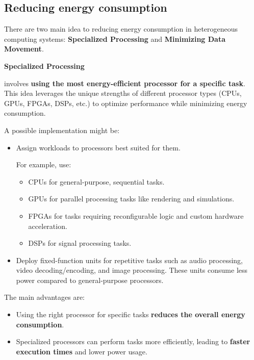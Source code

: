 \subsection{Reducing energy consumption}

There are two main idea to reducing energy consumption in heterogeneous computing systems: \textbf{Specialized Processing} and \textbf{Minimizing Data Movement}.

\highspace
\begin{flushleft}
    \textcolor{Green3}{ \textbf{Specialized Processing}}
\end{flushleft}
 involves \textbf{using the most energy-efficient processor for a specific task}. This idea leverages the unique strengths of different processor types (CPUs, GPUs, FPGAs, DSPs, etc.) to optimize performance while minimizing energy consumption.

\highspace
A possible implementation might be:
\begin{itemize}
    \item Assign workloads to processors best suited for them.
    \begin{examplebox}
        For example, use:
        \begin{itemize}
            \item CPUs for general-purpose, sequential tasks.
            \item GPUs for parallel processing tasks like rendering and simulations.
            \item FPGAs for tasks requiring reconfigurable logic and custom hardware acceleration.
            \item DSPs for signal processing tasks.
        \end{itemize}
    \end{examplebox}

    \item Deploy fixed-function units for repetitive tasks such as audio processing, video decoding/encoding, and image processing. These units consume less power compared to general-purpose processors.
\end{itemize}
The main advantages are:
\begin{itemize}[label=\textcolor{Green3}{}]
    \item Using the right processor for specific tasks \textbf{reduces the overall energy consumption}.
    \item Specialized processors can perform tasks more efficiently, leading to \textbf{faster execution times} and lower power usage.
\end{itemize}

